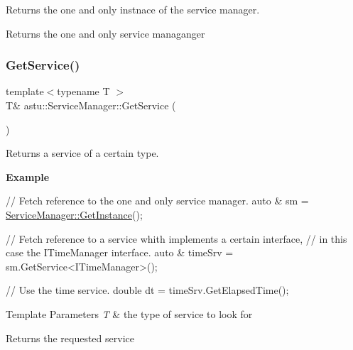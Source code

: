 Returns the one and only instnace of the service manager.

\begin{DoxyReturn}{Returns}
the one and only service managanger 
\end{DoxyReturn}
\mbox{\label{classastu_1_1ServiceManager_a751f5f152803ee0327ab315cd5088414}} 
\subsubsection{\texorpdfstring{Get\+Service()}{GetService()}}
{\footnotesize\ttfamily template$<$typename T $>$ \\
T\& astu\+::\+Service\+Manager\+::\+Get\+Service (\begin{DoxyParamCaption}{ }\end{DoxyParamCaption})\hspace{0.3cm}{\ttfamily [inline]}}

Returns a service of a certain type.

{\bfseries Example}


\begin{DoxyCode}
\textcolor{comment}{// Fetch reference to the one and only service manager.}
\textcolor{keyword}{auto} & sm = \hyperlink{classastu_1_1ServiceManager_a26941fe98ea3f2792deca62e4124bf15}{ServiceManager::GetInstance}();

\textcolor{comment}{// Fetch reference to a service whith implements a certain interface,}
\textcolor{comment}{// in this case the ITimeManager interface.}
\textcolor{keyword}{auto} & timeSrv = sm.GetService<ITimeManager>();

\textcolor{comment}{// Use the time service.}
\textcolor{keywordtype}{double} dt = timeSrv.GetElapsedTime();
\end{DoxyCode}



\begin{DoxyTemplParams}{Template Parameters}
{\em T} & the type of service to look for \\
\hline
\end{DoxyTemplParams}
\begin{DoxyReturn}{Returns}
the requested service 
\end{DoxyReturn}

